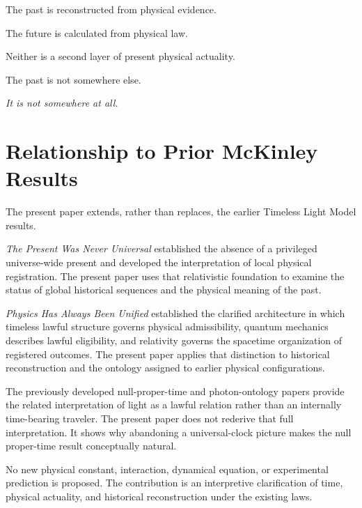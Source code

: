 \documentclass[12pt,onecolumn]{article}
\begin{document}
The past is reconstructed from physical evidence.

The future is calculated from physical law.

Neither is a second layer of present physical actuality.

The past is not somewhere else.

\emph{It is not somewhere at all.}

\section*{Relationship to Prior McKinley Results}

The present paper extends, rather than replaces, the earlier Timeless Light Model results.

\emph{The Present Was Never Universal} established the absence of a privileged universe-wide present and developed the interpretation of local physical registration. The present paper uses that relativistic foundation to examine the status of global historical sequences and the physical meaning of the past.

\emph{Physics Has Always Been Unified} established the clarified architecture in which timeless lawful structure governs physical admissibility, quantum mechanics describes lawful eligibility, and relativity governs the spacetime organization of registered outcomes. The present paper applies that distinction to historical reconstruction and the ontology assigned to earlier physical configurations.

The previously developed null-proper-time and photon-ontology papers provide the related interpretation of light as a lawful relation rather than an internally time-bearing traveler. The present paper does not rederive that full interpretation. It shows why abandoning a universal-clock picture makes the null proper-time result conceptually natural.

No new physical constant, interaction, dynamical equation, or experimental prediction is proposed. The contribution is an interpretive clarification of time, physical actuality, and historical reconstruction under the existing laws.
\end{document}
